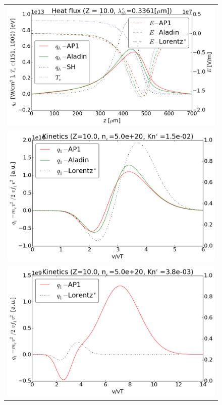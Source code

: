 \begin{figure}[tbh]
  \begin{center}
    \begin{tabular}{c}
      \includegraphics[width=\figscale\textwidth]{../VFPdata/C7_Aladin_case3_heatflux.png} \\
      \includegraphics[width=\figscale\textwidth]{../VFPdata/C7_Aladin_case3_kinetics.png} \\
      \includegraphics[width=\figscale\textwidth]{../VFPdata/C7_Aladin_case3_nonlocal_kinetics.png}  

\end{tabular}
\end{center}
\end{figure}
